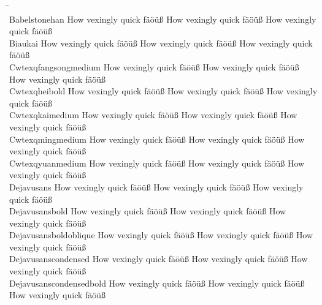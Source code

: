 \begin{tabbing}
\phantom{XXXXXXXXXXXXXXXXXXXXXXXXX} \= \phantom{XXXXXXXXXXXXXXXXXXXXXXXXXXXXXXXXXXXXXXXXXXXXXXXXXXXXXXXXXXXX} \\
Babelstonehan \> {\mktsStyleNormal{}How vexingly quick fäöüß} {\mktsFontfileBabelstonehan{}How vexingly quick fäöüß} {\mktsStyleItalic{}How vexingly quick fäöüß} \\
Biaukai \> {\mktsStyleNormal{}How vexingly quick fäöüß} {\mktsFontfileBiaukai{}How vexingly quick fäöüß} {\mktsStyleItalic{}How vexingly quick fäöüß} \\
Cwtexqfangsongmedium \> {\mktsStyleNormal{}How vexingly quick fäöüß} {\mktsFontfileCwtexqfangsongmedium{}How vexingly quick fäöüß} {\mktsStyleItalic{}How vexingly quick fäöüß} \\
Cwtexqheibold \> {\mktsStyleNormal{}How vexingly quick fäöüß} {\mktsFontfileCwtexqheibold{}How vexingly quick fäöüß} {\mktsStyleItalic{}How vexingly quick fäöüß} \\
Cwtexqkaimedium \> {\mktsStyleNormal{}How vexingly quick fäöüß} {\mktsFontfileCwtexqkaimedium{}How vexingly quick fäöüß} {\mktsStyleItalic{}How vexingly quick fäöüß} \\
Cwtexqmingmedium \> {\mktsStyleNormal{}How vexingly quick fäöüß} {\mktsFontfileCwtexqmingmedium{}How vexingly quick fäöüß} {\mktsStyleItalic{}How vexingly quick fäöüß} \\
Cwtexqyuanmedium \> {\mktsStyleNormal{}How vexingly quick fäöüß} {\mktsFontfileCwtexqyuanmedium{}How vexingly quick fäöüß} {\mktsStyleItalic{}How vexingly quick fäöüß} \\
Dejavusans \> {\mktsStyleNormal{}How vexingly quick fäöüß} {\mktsFontfileDejavusans{}How vexingly quick fäöüß} {\mktsStyleItalic{}How vexingly quick fäöüß} \\
Dejavusansbold \> {\mktsStyleNormal{}How vexingly quick fäöüß} {\mktsFontfileDejavusansbold{}How vexingly quick fäöüß} {\mktsStyleItalic{}How vexingly quick fäöüß} \\
Dejavusansboldoblique \> {\mktsStyleNormal{}How vexingly quick fäöüß} {\mktsFontfileDejavusansboldoblique{}How vexingly quick fäöüß} {\mktsStyleItalic{}How vexingly quick fäöüß} \\
Dejavusanscondensed \> {\mktsStyleNormal{}How vexingly quick fäöüß} {\mktsFontfileDejavusanscondensed{}How vexingly quick fäöüß} {\mktsStyleItalic{}How vexingly quick fäöüß} \\
Dejavusanscondensedbold \> {\mktsStyleNormal{}How vexingly quick fäöüß} {\mktsFontfileDejavusanscondensedbold{}How vexingly quick fäöüß} {\mktsStyleItalic{}How vexingly quick fäöüß} \\

\end{tabbing}

